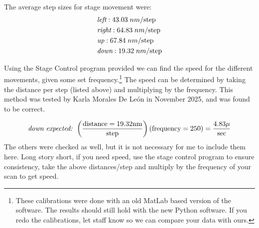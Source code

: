 \documentclass{../lab}
\begin{document}



The average step sizes for stage movement were:
\begin{align*}
    &\emph{left}: 43.03 \;nm/\text{step} \\
    &\emph{right}: 64.83 \;nm/\text{step} \\
    &\emph{up}:  67.84\;nm/\text{step} \\
    &\emph{down}: 19.32\;nm/\text{step}
\end{align*}


Using the Stage Control program provided we can find the speed for the different movements, given some set frequency.\footnote{These calibrations were done with an old MatLab based version of the software. The results should still hold with the new Python software. If you redo the calibrations, let staff know so we can compare your data with ours.} The speed can be determined by taking the distance per step (listed above) and multiplying by the frequency. This method was tested by Karla Morales De Le\'on in November 2025, and was found to be correct.

\begin{align*}
    &\emph{down expected: } \left(\frac{\text{distance} = 19.32 \text{nm}}{\text{step}}\right)(\text{frequency} = 250)=\frac{4.83 \mu}{\text{sec}} \\
\end{align*}
The others were checked as well, but it is not necessary for me to include them here. Long story short, if you need speed, use the stage control program to ensure consistency, take the above distances/step and multiply by the frequency of your scan to get speed.
\end{document}
